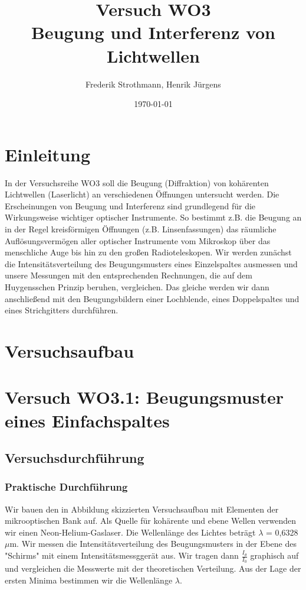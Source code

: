 \documentclass[12pt]{scrartcl}
\title{Versuch WO3\\ Beugung und Interferenz von Lichtwellen}
\author{Frederik Strothmann, Henrik Jürgens}
\date{\today}
\begin{document}

\maketitle
\tableofcontents
\newpage


\section{Einleitung}

In der Versuchsreihe WO3 soll die Beugung (Diffraktion) von kohärenten Lichtwellen (Laserlicht) an verschiedenen Öffnungen untersucht werden.
Die Erscheinungen von Beugung und Interferenz sind grundlegend für die Wirkungsweise wichtiger optischer Instrumente. So bestimmt z.B. die Beugung an in der Regel kreisförmigen Öffnungen (z.B. Linsenfassungen) das räumliche Auflösungsvermögen aller optischer Instrumente vom Mikroskop über das menschliche Auge bis hin zu den großen Radioteleskopen. Wir werden zunächst die Intensitätsverteilung des Beugungsmusters eines Einzelspaltes ausmessen und unsere Messungen mit den entsprechenden Rechnungen, die auf dem Huygensschen Prinzip beruhen, vergleichen. Das gleiche werden wir dann anschließend mit den Beugungsbildern einer Lochblende, eines Doppelspaltes und eines Strichgitters durchführen.

\section{Versuchsaufbau}

\section{Versuch WO3.1: Beugungsmuster eines Einfachspaltes}
\subsection{Versuchsdurchführung}

\subsubsection{Praktische Durchführung}
Wir bauen den in Abbildung 
skizzierten Versuchsaufbau mit Elementen der mikrooptischen Bank auf. Als Quelle für kohärente und ebene Wellen verwenden wir einen Neon-Helium-Gaslaser. Die Wellenlänge des Lichtes beträgt $\lambda$ = 0,6328 $\mu$m.
Wir messen die Intensitätsverteilung des Beugungsmusters in der Ebene des "Schirms" mit einem Intensitätsmessggerät aus. Wir tragen dann $\frac{I_\theta}{I_0}$ graphisch auf und vergleichen die Messwerte mit der theoretischen Verteilung. Aus der Lage der ersten Minima bestimmen wir die Wellenlänge $\lambda$.
\end{document}

